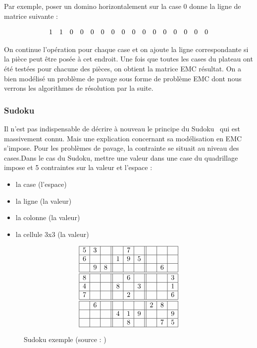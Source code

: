 \documentclass[a4paper]{article}
\begin{document}
Par exemple, poser un domino horizontalement sur la case 0 donne la ligne
de matrice suivante : 

\[
  \begin{array}{ c c c c c c c c c c c c c c c c }
	1 & 1 & 0 & 0 & 0 & 0 & 0 & 0 & 0 & 0 & 0 & 0 & 0 & 0 & 0 & 0 
  \end{array}
\]

On continue l'opération pour chaque case et on ajoute la ligne correspondante
si la pièce peut être posée à cet endroit. 
Une fois que toutes les cases du plateau ont été testées pour chacune des pièces,
on obtient la matrice EMC résultat. On a bien modélisé un problème de pavage 
sous forme de problème EMC dont nous verrons les algorithmes de résolution par
la suite.

\subsubsection{Sudoku}

Il n'est pas indispensable de décrire à nouveau le principe du 
Sudoku~\cite{sudoku} qui est massivement connu. Mais une explication concernant
sa modélisation en EMC s'impose.
Pour les problèmes de pavage, la contrainte se situait au niveau des cases.Dans
le cas du Sudoku, mettre une valeur dans une case du quadrillage impose et
5 contraintes sur la valeur et l'espace : 
\begin{itemize}
\item la case (l'espace)
\item la ligne (la valeur)
\item la colonne (la valeur)
\item la cellule 3x3 (la valeur)
\end{itemize}


\begin{figure}[h]
\centering
\[
\begin{array}{|c|c|c||c|c|c||c|c|c|}
\hline
5 & 3 &   &   & 7 &   &  &   &    \\
\hline
6 &   &   & 1 & 9 & 5 &  &   &    \\
\hline
  & 9 & 8 &   &   &   &  & 6 &    \\
\hline
\hline
8 &   &   &   & 6 &   &   &   & 3 \\
\hline
4 &   &   & 8 &   & 3 &   &   & 1 \\
\hline
7 &   &   &   & 2 &   &   &   & 6 \\
\hline
\hline
  & 6 &   &   &   &   & 2 & 8 &   \\
\hline
  &   &   & 4 & 1 & 9 &   &   & 9 \\
\hline
  &   &   &   & 8 &   &   & 7 & 5 \\
\hline
\end{array}
\]
\caption{\label{sudoku} Sudoku exemple (source : \cite{sudoku})}
\end{figure}
\end{document}
